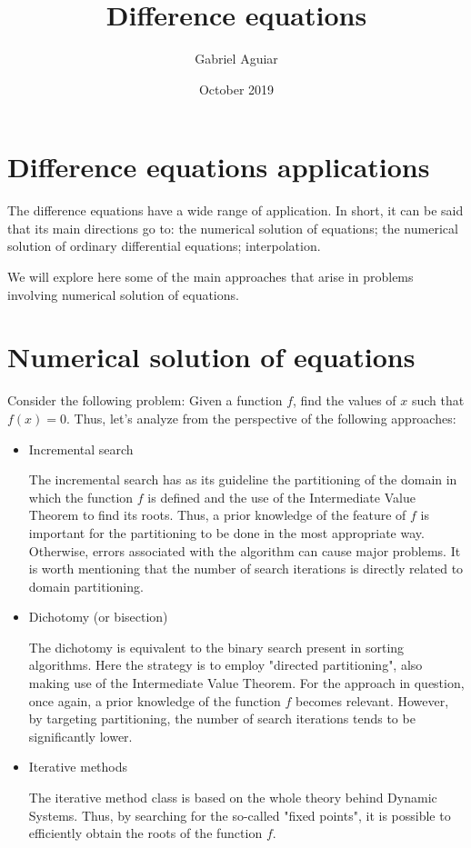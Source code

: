 \documentclass{article}
\title{Difference equations}
\author{Gabriel Aguiar}
\date{October 2019}
\begin{document}
\maketitle

\section{Difference equations applications}

The difference equations have a wide range of application. In short, it can be said that its main directions go to: the numerical solution of equations; the numerical solution of ordinary differential equations; interpolation.

We will explore here some of the main approaches that arise in problems involving numerical solution of equations.

\section{Numerical solution of equations}

Consider the following problem: Given a function $f$, find the values of $x$ such that $f(x) = 0$. Thus, let's analyze from the perspective of the following approaches:

\begin{itemize}

\item Incremental search

The incremental search has as its guideline the partitioning of the domain in which the function $f$ is defined and the use of the Intermediate Value Theorem to find its roots. Thus, a prior knowledge of the feature of $f$ is important for the partitioning to be done in the most appropriate way. Otherwise, errors associated with the algorithm can cause major problems. It is worth mentioning that the number of search iterations is directly related to domain partitioning.

\item Dichotomy (or bisection)

The dichotomy is equivalent to the binary search present in sorting algorithms. Here the strategy is to employ "directed partitioning", also making use of the Intermediate Value Theorem. For the approach in question, once again, a prior knowledge of the function $f$ becomes relevant. However, by targeting partitioning, the number of search iterations tends to be significantly lower.

\item Iterative methods

The iterative method class is based on the whole theory behind Dynamic Systems. Thus, by searching for the so-called "fixed points", it is possible to efficiently obtain the roots of the function $f$.

\end{itemize}
\end{document}
